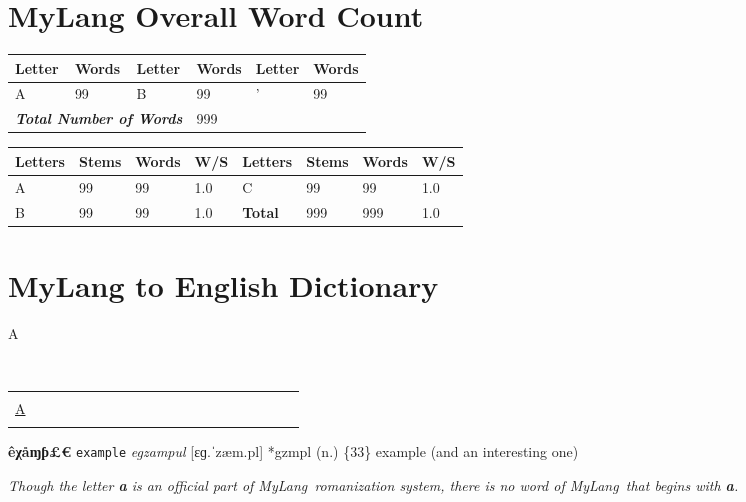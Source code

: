 \documentclass[oneside]{book}
\newcommand{\LanguageName}{MyLang}
\begin{document}
\chapter{MyLang Overall Word Count}

\begin{center}
\begin{tabular}{|l|l|l|l|l|l|}\hline
\textbf{Letter}&\textbf{Words}&\textbf{Letter}&\textbf{Words}&\textbf{Letter}&\textbf{Words}\\\hline
A&99&B&99&'&99\\\hline
\multicolumn{3}{|r|}{\textbf{\textit{Total Number of Words}}}&\multicolumn{3}{|l|}{999}\\\hline
\end{tabular}

\vskip 1cm

\begin{tabular}{|l|l|l|l|l|l|l|l|}\hline
\textbf{Letters}&\textbf{Stems}&\textbf{Words}&\textbf{W/S}&\textbf{Letters}&\textbf{Stems}&\textbf{Words}&\textbf{W/S}\\\hline
A&99&99&1.0&C&99&99&1.0\\\hline
B&99&99&1.0&\textbf{Total}&999&999&1.0\\\hline
\end{tabular}
\end{center}

\chapter{MyLang to English Dictionary}

\begin{center}
\Huge
\hypertarget{MYLA}{A}

\Large
{\ }

\normalsize
\begin{tabular}{*{20}{|c}|}\hline
\\
\hyperlink{MYLA}{\Large A}\\
\\\hline
\end{tabular}
\end{center}

{
\setlength{\parindent}{0cm}
\textbf{êχåɱƥ£€} \texttt{example} \textsl{egzampul} [ɛɡ.ˈzæm.pl] *gzmpl (n.) \{33\} example (and an interesting one)
}


\emph{Though the letter \textbf{a} is an official part of \LanguageName\ romanization system, there is no word of \LanguageName\ that begins with \textbf{a}.}
\end{document}
